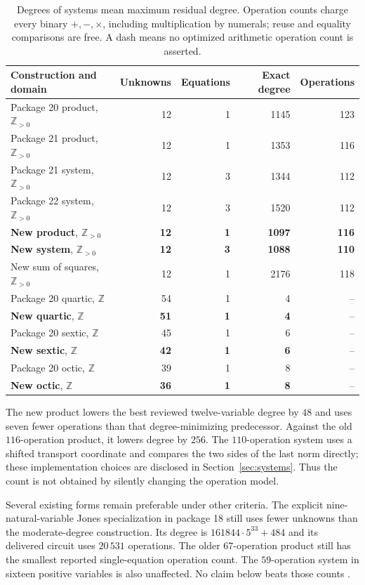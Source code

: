 \documentclass[11pt]{article}
\theoremstyle{remark}\newtheorem{remark}[theorem]{Remark}
\newcommand{\Z}{\mathbb Z}\newcommand{\N}{\mathbb N}
\newcommand{\Pos}{\mathbb Z_{>0}}\newcommand{\Con}{\operatorname{Con}}
\begin{document}
\begin{table}[ht]
\centering\small
\begin{tabular}{@{}lrrrr@{}}
\toprule
Construction and domain & Unknowns & Equations & Exact degree & Operations\\
\midrule
Package 20 product, $\Pos$ &12&1&1145&123\\
Package 21 product, $\Pos$ &12&1&1353&116\\
Package 21 system, $\Pos$ &12&3&1344&112\\
Package 22 system, $\Pos$ &12&3&1520&112\\
\textbf{New product}, $\Pos$ &\textbf{12}&\textbf{1}&\textbf{1097}&\textbf{116}\\
\textbf{New system}, $\Pos$ &\textbf{12}&\textbf{3}&\textbf{1088}&\textbf{110}\\
New sum of squares, $\Pos$ &12&1&2176&118\\
\midrule
Package 20 quartic, $\Z$ &54&1&4&--\\
\textbf{New quartic}, $\Z$ &\textbf{51}&\textbf{1}&\textbf{4}&--\\
Package 20 sextic, $\Z$ &45&1&6&--\\
\textbf{New sextic}, $\Z$ &\textbf{42}&\textbf{1}&\textbf{6}&--\\
Package 20 octic, $\Z$ &39&1&8&--\\
\textbf{New octic}, $\Z$ &\textbf{36}&\textbf{1}&\textbf{8}&--\\
\bottomrule
\end{tabular}
\caption{Degrees of systems mean maximum residual degree. Operation counts
charge every binary $+,-,\times$, including multiplication by numerals;
reuse and equality comparisons are free. A dash means no optimized arithmetic
operation count is asserted.}\label{tab:frontier}
\end{table}

The new product lowers the best reviewed twelve-variable degree by $48$ and
uses seven fewer operations than that degree-minimizing predecessor. Against
the old $116$-operation product, it lowers degree by $256$. The $110$-operation
system uses a shifted transport coordinate and compares the two sides of the
last norm directly; these implementation choices are disclosed in
Section~\ref{sec:systems}. Thus the count is not obtained by silently changing
the operation model.

Several existing forms remain preferable under other criteria. The explicit
nine-natural-variable Jones specialization in package 18 still uses fewer
unknowns than the moderate-degree construction. Its degree is
$161844\cdot5^{33}+484$ and its delivered circuit uses $20\,531$ operations.
The older $67$-operation product still has the smallest reported single-equation
operation count. The $59$-operation system in sixteen positive variables is
also unaffected. No claim below beats those counts \cite{catalogue,jones9}.
\end{document}
